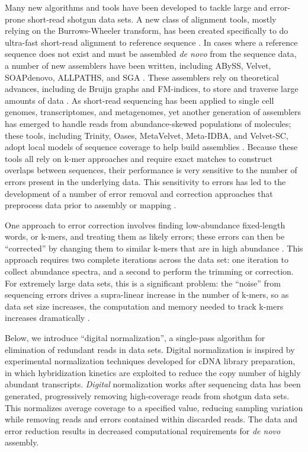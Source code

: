 \documentclass[10pt]{article}
\begin{document}
Many new algorithms and tools have been developed to tackle large and
error-prone short-read shotgun data sets. A new class of alignment
tools, mostly relying on the Burrows-Wheeler transform, has been
created specifically to do ultra-fast short-read alignment to
reference sequence \cite{pubmed19430453}.  In cases where a reference
sequence does not exist and must be assembled {\em de novo} from the
sequence data, a number of new assemblers have been written, including
ABySS, Velvet, SOAPdenovo, ALLPATHS, and SGA
\cite{pubmed20211242,pubmed21187386,pubmed22156294}.  These assemblers
rely on theoretical advances, including de Bruijn graphs and
FM-indices, to store and traverse large amounts of data
\cite{pubmed22068540,pubmed20529929}.  As short-read sequencing has
been applied to single cell genomes, transcriptomes, and metagenomes,
yet another generation of assemblers has emerged to handle reads from
abundance-skewed populations of molecules; these tools, including
Trinity, Oases, MetaVelvet, Meta-IDBA, and Velvet-SC, adopt local
models of sequence coverage to help build assemblies
\cite{pubmed21572440,pubmed22368243,metavelvet,pubmed21685107,pubmed21926975}.
Because these tools all rely on k-mer approaches and require exact
matches to construct overlaps between sequences, their performance is
very sensitive to the number of errors present in the underlying data.
This sensitivity to errors has led to the development of a number of
error removal and correction approaches that preprocess data prior to
assembly or mapping
\cite{pubmed21685062,pubmed15059830,pubmed21114842}.

One approach to error correction involves finding low-abundance
fixed-length words, or k-mers, and treating them as likely errors;
these errors can then be ``corrected'' by changing them to similar
k-mers that are in high abundance \cite{pubmed21114842}.  This
approach requires two complete iterations across the data set: one
iteration to collect abundance spectra, and a second to perform the
trimming or correction.  For extremely large data sets, this is a
significant problem: the ``noise'' from sequencing errors drives a
supra-linear increase in the number of k-mers, so as data set size
increases, the computation and memory needed to track k-mers increases
dramatically \cite{pubmed21245053}.


Below, we introduce ``digital normalization'', a single-pass algorithm
for elimination of redundant reads in data sets.  Digital
normalization is inspired by experimental normalization techniques
developed for cDNA library preparation, in which hybridization
kinetics are exploited to reduce the copy number of highly abundant
transcripts\cite{pubmed8889548,pubmed7937745}.  {\em Digital}
normalization works after sequencing data has been generated,
progressively removing high-coverage reads from shotgun data sets.
This normalizes average coverage to a specified value, reducing
sampling variation while removing reads and errors contained within
discarded reads.  The data and error reduction results in decreased
computational requirements for {\em de novo} assembly.
\end{document}
